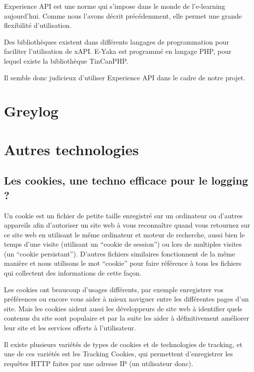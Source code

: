             Experience API est une norme qui s’impose dans le monde de l’e-learning aujourd’hui. Comme nous l’avons décrit précédemment, elle permet une grande flexibilité d’utilisation.

            Des bibliothèques existent dans différents langages de programmation pour faciliter l’utilisation de xAPI. E-Yaka est programmé en langage PHP, pour lequel existe la bibliothèque TinCanPHP.

            Il semble donc judicieux d’utiliser Experience API dans le cadre de notre projet.


    \section{Greylog  }
    
    \section{Autres technologies}
    
        \subsection{Les cookies, une techno efficace pour le logging ?}
        
            Un cookie est un fichier de petite taille enregistré sur un ordinateur ou d'autres appareils afin d'autoriser un site web à vous reconnaître quand vous retournez sur ce site web en utilisant le même ordinateur et moteur de recherche, aussi bien le temps d'une visite (utilisant un \enquote{cookie de session}) ou lors de multiples visites (un \enquote{cookie persistant}). D'autres fichiers similaires fonctionnent de la même manière et nous utilisons le mot \enquote{cookie} pour faire référence à tous les fichiers qui collectent des informations de cette façon.
            
            Les cookies ont beaucoup d'usages différents, par exemple enregistrer vos préférences ou encore vous aider à mieux naviguer entre les différentes pages d'un site. Mais les cookies aident aussi les développeurs de site web à identifier quels contenus du site sont populaire et par la suite les aider à définitivement améliorer leur site et les services offerts à l'utilisateur.
            
            Il existe plusieurs variétés de types de cookies et de technologies de tracking, et une de ces variétés est les Tracking Cookies, qui permettent d'enregistrer les requêtes HTTP faites par une adresse IP (un utilisateur donc). 
            
